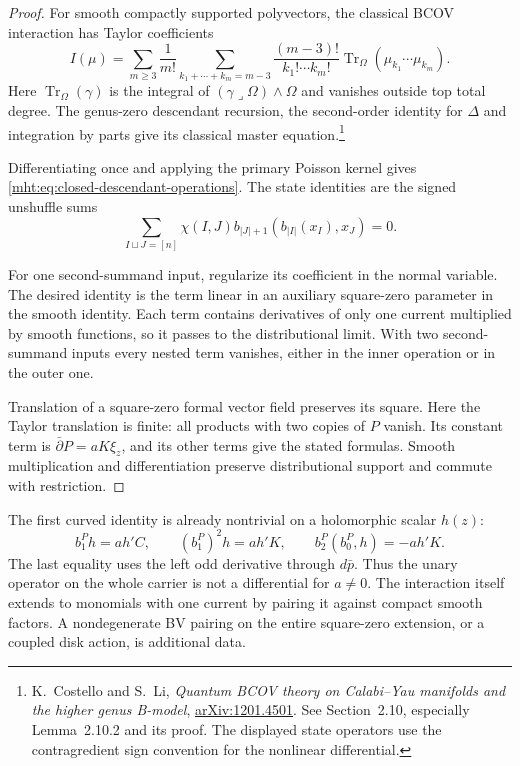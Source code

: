 \begin{proof}
For smooth compactly supported polyvectors, the classical
BCOV interaction has Taylor coefficients
\[
 I(\mu)=\sum_{m\geq3}\frac1{m!}
 \sum_{k_1+\cdots+k_m=m-3}
 \frac{(m-3)!}{k_1!\cdots k_m!}
              \operatorname{Tr}_\Omega(\mu_{k_1}\cdots\mu_{k_m}).
\]
Here $\operatorname{Tr}_\Omega(\gamma)$ is the integral of
$(\gamma\mathbin{\lrcorner}\Omega)\wedge\Omega$ and vanishes
outside top total degree. The genus-zero descendant recursion,
the second-order identity for $\Delta$ and integration by
parts give its classical master equation.\footnote{K.~Costello
and S.~Li, \emph{Quantum BCOV theory on Calabi--Yau manifolds
and the higher genus B-model},
\href{https://arxiv.org/abs/1201.4501}{arXiv:1201.4501}.
See Section~2.10, especially Lemma~2.10.2 and its proof.
The displayed state operators use the contragredient sign
convention for the nonlinear differential.}

Differentiating once and applying the primary Poisson kernel
gives \eqref{mht:eq:closed-descendant-operations}.
The state identities are the signed unshuffle sums
\[
 \sum_{I\sqcup J=[n]}\chi(I,J)
 b_{|J|+1}(b_{|I|}(x_I),x_J)=0.
\]

For one second-summand input, regularize its coefficient
in the normal variable. The desired identity is the term
linear in an auxiliary square-zero parameter in the smooth
identity. Each term contains derivatives of only one current
multiplied by smooth functions, so it passes to the
distributional limit. With two second-summand inputs every
nested term vanishes, either in the inner operation or
in the outer one.

Translation of a square-zero formal vector field preserves
its square. Here the Taylor translation is finite: all
products with two copies of $P$ vanish. Its constant term
is $\bar\partial P=aK\xi_z$, and its other terms give
the stated formulas. Smooth multiplication and differentiation
preserve distributional support and commute with restriction.
\end{proof}

The first curved identity is already nontrivial on a
holomorphic scalar $h(z)$:
\[
 b_1^Ph=ah'C,\qquad
 (b_1^P)^2h=ah'K,\qquad
 b_2^P(b_0^P,h)=-ah'K.
\]
The last equality uses the left odd derivative through
$d\bar p$. Thus the unary operator on the whole carrier
is not a differential for $a\ne0$.
The interaction itself extends to monomials with one
current by pairing it against compact smooth factors.
A nondegenerate BV pairing on the entire square-zero
extension, or a coupled disk action, is additional data.

